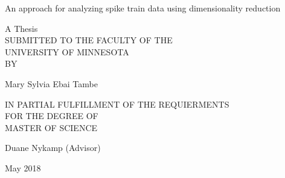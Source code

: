 
\begingroup
        \let\clearpage\relax
        \let\cleardoublepage\relax
        \let\cleardoublepage\relax

\begin{titlepage}
    \begin{center}
        \vspace*{1cm}
        
        \Huge
        An approach for analyzing spike train data using dimensionality reduction\\
        
      
        \vspace{1.5cm}
        
        
        
        A  Thesis\\
        
    SUBMITTED TO THE FACULTY OF THE\\
    
    UNIVERSITY OF MINNESOTA\\
    
         BY\\
         
         \vspace{1.5cm}
         
         Mary Sylvia Ebai Tambe\\
        
           
            \vspace{1.5cm}
           
          
        IN PARTIAL FULFILLMENT OF THE REQUIERMENTS\\
        
           FOR THE DEGREE OF\\
           
         MASTER OF SCIENCE \\
     
         
  
            \vspace{1.5cm}
        
        
        
        Duane Nykamp (Advisor)\\
        
        
        
        \vspace{0.5cm}
        
        
        May 2018
        
        
        
        
    \end{center}
\end{titlepage}


\thispagestyle{empty}
        \endgroup           
        \vfill